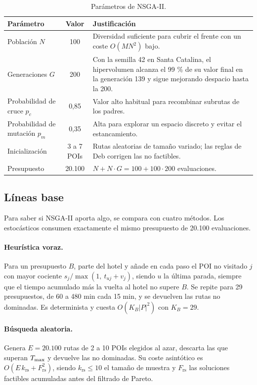 \begin{table}[H]
\centering
\small
\caption{Parámetros de NSGA-II.}
\label{tab:parametros}
\begin{tabularx}{\textwidth}{@{}l c X@{}}
\toprule
Parámetro & Valor & Justificación \\
\midrule
Población $N$ & 100 & Diversidad suficiente para cubrir el frente con un coste $O(MN^2)$ bajo. \\
Generaciones $G$ & 200 & Con la semilla 42 en Santa Catalina, el hipervolumen alcanza el 99 \% de su valor final en la generación 139 y sigue mejorando despacio hasta la 200. \\
Probabilidad de cruce $p_c$ & 0,85 & Valor alto habitual para recombinar subrutas de los padres. \\
Probabilidad de mutación $p_m$ & 0,35 & Alta para explorar un espacio discreto y evitar el estancamiento. \\
Inicialización & 3 a 7 POIs & Rutas aleatorias de tamaño variado; las reglas de Deb corrigen las no factibles. \\
Presupuesto & 20.100 & $N + N \cdot G = 100 + 100 \cdot 200$ evaluaciones. \\
\bottomrule
\end{tabularx}
\end{table}

\subsection{Líneas base}
\label{sec:lineas_base}

Para saber si NSGA-II aporta algo, se compara con cuatro métodos. Los estocásticos consumen exactamente el mismo presupuesto de 20.100 evaluaciones.

\paragraph{Heurística voraz.} Para un presupuesto $B$, parte del hotel y añade en cada paso el POI no visitado $j$ con mayor cociente $s_j / \max(1,\ t_{uj} + v_j)$, siendo $u$ la última parada, siempre que el tiempo acumulado más la vuelta al hotel no supere $B$. Se repite para 29 presupuestos, de 60 a 480 min cada 15 min, y se devuelven las rutas no dominadas. Es determinista y cuesta $O(K_B |P|^2)$ con $K_B = 29$.

\paragraph{Búsqueda aleatoria.} Genera $E = 20.100$ rutas de 2 a 10 POIs elegidos al azar, descarta las que superan $T_{\max}$ y devuelve las no dominadas. Su coste asintótico es $O(E\,k_{\mathrm{rs}} + F_{\mathrm{rs}}^2)$, siendo $k_{\mathrm{rs}} \le 10$ el tamaño de muestra y $F_{\mathrm{rs}}$ las soluciones factibles acumuladas antes del filtrado de Pareto.

